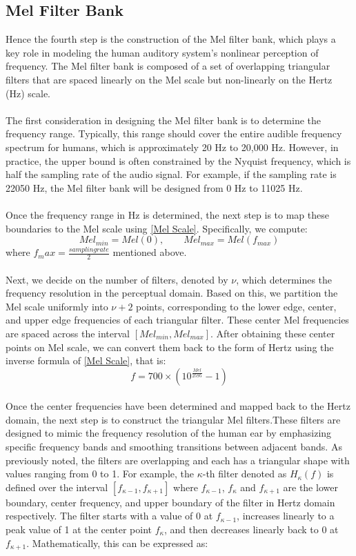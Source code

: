 \subsection{Mel Filter Bank}
Hence the fourth step is the construction of the Mel filter bank, which plays a key role in modeling the human auditory system’s nonlinear perception of frequency. The Mel filter bank is composed of a set of overlapping triangular filters that are spaced linearly on the Mel scale but non-linearly on the Hertz (Hz) scale.\\
\\
The first consideration in designing the Mel filter bank is to determine the frequency range. Typically, this range should cover the entire audible frequency spectrum for humans, which is approximately 20 Hz to 20,000 Hz. However, in practice, the upper bound is often constrained by the Nyquist frequency, which is half the sampling rate of the audio signal. For example, if the sampling rate is 22050 Hz, the Mel filter bank will be designed from 0 Hz to 11025 Hz.\\
\\
Once the frequency range in Hz is determined, the next step is to map these boundaries to the Mel scale using \eqref{Mel Scale}. Specifically, we compute:
\begin{equation}
Mel_{min}=Mel(0), \qquad  Mel_{max}=Mel(f_{max})
\end{equation}
where $f_max=\frac{sampling rate}{2}$ mentioned above.\\
\\
Next, we decide on the number of filters, denoted by $\nu$, which determines the frequency resolution in the perceptual domain. Based on this, we partition the Mel scale uniformly into $\nu+2$ points, corresponding to the lower edge, center, and upper edge frequencies of each triangular filter. These center Mel frequencies are spaced across the interval $[Mel_{min}, Mel_{max}]$. After obtaining these center points on Mel scale, we can convert them back to the form of Hertz using the inverse formula of \eqref{Mel Scale}, that is: \\
\begin{equation}
f=700\times (10^{\frac{Mel}{2595}}-1)
\end{equation}\\
Once the center frequencies have been determined and mapped back to the Hertz domain, the next step is to construct the triangular Mel filters.These filters are designed to mimic the frequency resolution of the human ear by emphasizing specific frequency bands and smoothing transitions between adjacent bands. As previously noted, the filters are overlapping and each has a triangular shape with values ranging from 0 to 1. For example, the $\kappa$-th filter denoted as $H_{\kappa}(f)$ is defined over the interval $[f_{\kappa-1},f_{\kappa+1}]$ where $f_{\kappa-1}$, $f_{\kappa}$ and $f_{\kappa+1}$ are the lower boundary, center frequency, and upper boundary of the filter in Hertz domain respectively. The filter starts with a value of 0 at $f_{\kappa-1}$, increases linearly to a peak value of 1 at the center point $f_{\kappa}$, and then decreases linearly back to 0 at $f_{\kappa+1}$.  Mathematically, this can be expressed as:\\
